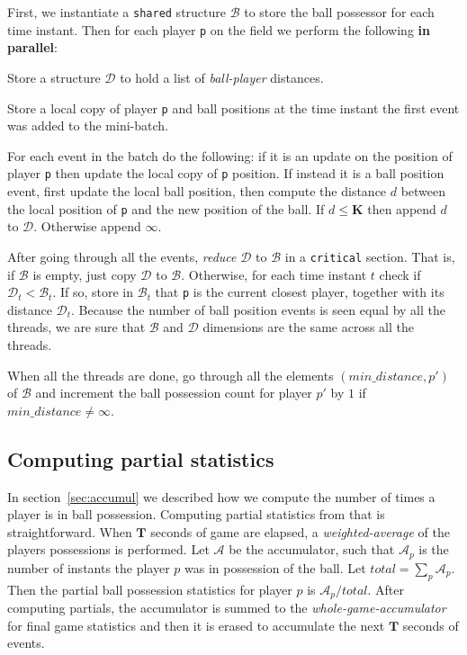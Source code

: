 \documentclass[a4paper, 11pt]{article}
\begin{document}
\begin{multicols}{2}
First, we instantiate a \texttt{shared} structure $\mathcal{B}$ to store the ball possessor for each time instant. Then for each player \texttt{p} on the field we perform the following \textbf{in parallel}:
\begin{enumerate*}[(a)]
    \item Store a structure $\mathcal{D}$ to hold a list of \textit{ball-player} distances.
    \item Store a local copy of player \texttt{p} and ball positions at the time instant the first event was added to the mini-batch.
    \item For each event in the batch do the following: if it is an update on the position of player \texttt{p} then update the local copy of \texttt{p} position. If instead it is a ball position event, first update the local ball position, then compute the distance $d$ between the local position of \texttt{p} and the new position of the ball. If $d \leq \mathbf{K}$ then append $d$ to $\mathcal{D}$. Otherwise append $\infty$.
    \item After going through all the events, \textit{reduce} $\mathcal{D}$ to $\mathcal{B}$ in a \texttt{critical} section. That is, if $\mathcal{B}$ is empty, just copy $\mathcal{D}$ to $\mathcal{B}$. Otherwise, for each time instant $t$ check if $\mathcal{D}_t < \mathcal{B}_t$. If so, store in $\mathcal{B}_t$ that \texttt{p} is the current closest player, together with its distance $\mathcal{D}_t$. Because the number of ball position events is seen equal by all the threads, we are sure that $\mathcal{B}$ and $\mathcal{D}$ dimensions are the same across all the threads.
    \item When all the threads are done, go through all the elements $(min\_distance, p')$ of $\mathcal{B}$ and increment the ball possession count for player $p'$ by $1$ if $min\_distance \neq \infty$.
\end{enumerate*}

\subsection{Computing partial statistics}
In section~\ref{sec:accumul} we described how we compute the number of times a player is in ball possession. Computing partial statistics from that is straightforward. When $\mathbf{T}$ seconds of game are elapsed, a \textit{weighted-average} of the players possessions is performed. Let $\mathcal{A}$ be the accumulator, such that $\mathcal{A}_p$ is the number of instants the player $p$ was in possession of the ball. Let $total = \sum_p \mathcal{A}_p$. Then the partial ball possession statistics for player $p$ is $\mathcal{A}_p / total$. After computing partials, the accumulator is summed to the \emph{whole-game-accumulator} for final game statistics and then it is erased to accumulate the next $\mathbf{T}$ seconds of events.


\end{multicols}
\end{document}
